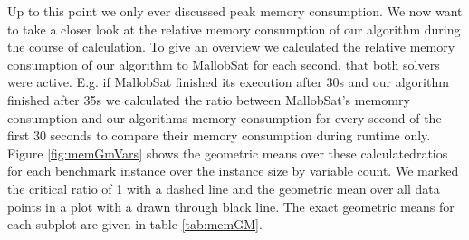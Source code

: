 \documentclass[12pt,a4paper,twoside]{scrartcl}
\numberwithin{equation}{section}
\begin{document}
\label{sec:GMs}
Up to this point we only ever discussed peak memory consumption. We now want to take a closer look at the relative memory consumption of our algorithm during the course of calculation. To give an overview we calculated the relative memory consumption of our algorithm to MallobSat for each second, that both solvers were active. E.g. if MallobSat finished its execution after 30s and our algorithm finished after 35s we calculated the ratio between MallobSat's memomry consumption and our algorithms memory consumption for every second of the first 30 seconds to compare their memory consumption during runtime only. Figure \ref{fig:memGmVars} shows the geometric means over these calculatedratios for each benchmark instance over the instance size by variable count. We marked the critical ratio of 1 with a dashed line and the geometric mean over all data points in a plot with a drawn through black line. The exact geometric means for each subplot are given in table \ref{tab:memGM}.
\end{document}
